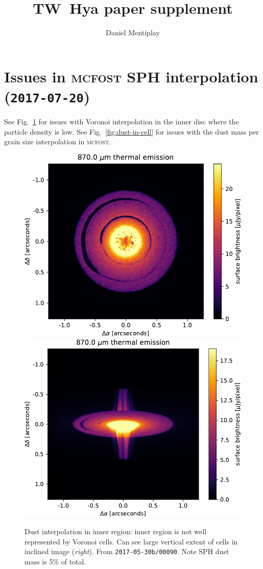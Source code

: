 \documentclass[usenatbib,a4paper,times,fleqn]{mnras}
\title[TW~Hya]{TW~Hya paper supplement}
\author[Mentiplay]{\parbox{\textwidth}{Daniel Mentiplay}}
\date{}
\newcommand{\mcfost}{\textsc{mcfost}}
\begin{document}
\maketitle


\section*{Issues in \mcfost{} SPH interpolation (\texttt{2017-07-20})}

See Fig.~\ref{fig:voro-inner-region} for issues with Voronoi interpolation in
the inner disc where the particle density is low. See
Fig.~\ref{fig:dust-in-cell} for issues with the dust mass per grain size
interpolation in \mcfost{}.

\begin{figure}
   \begin{center}
      \includegraphics[width=0.48\columnwidth]{figs/dust-interpolation-inner-region-faceon.pdf}
      \includegraphics[width=0.48\columnwidth]{figs/dust-interpolation-inner-region-incl75.pdf}
      \caption{Dust interpolation in inner region: inner region is not well
      represented by Voronoi cells. Can see large vertical extent of cells in
      inclined image (\textit{right}). From \texttt{2017-05-30b/00090}. Note SPH
      dust mass is 5\% of total.}
      \label{fig:voro-inner-region}
   \end{center}
\end{figure}
\end{document}
